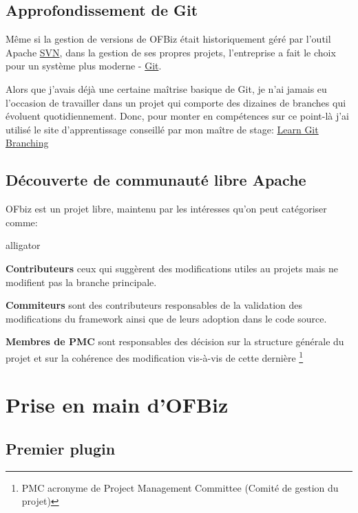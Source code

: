 \subsection{Approfondissement de Git }
Même si la gestion de versions de OFBiz était historiquement géré par l'outil Apache \href{https://subversion.apache.org/}{SVN}, dans la gestion de ses propres projets, l'entreprise a fait le choix pour un système plus moderne - \href{https://git-scm.com/}{Git}. 

Alors que j'avais déjà une certaine maîtrise basique de Git, je n'ai jamais eu l'occasion de travailler dans un projet qui comporte des dizaines de branches qui évoluent quotidiennement. Donc, pour monter en compétences sur ce point-là j'ai utilisé le site d'apprentissage conseillé par mon maître de stage: \href{https://learngitbranching.js.org/}{Learn Git Branching}

\subsection{Découverte de communauté libre Apache}
 OFbiz est un projet libre, maintenu par les intéresses qu'on peut catégoriser comme: 
 \begin{labeling}{alligator}
 	\item [\textbf{Contributeurs}] ceux qui suggèrent des modifications utiles au projets mais ne modifient pas la branche principale.
 	\item [\textbf{Commiteurs}] sont des contributeurs responsables de la validation des modifications du framework ainsi que de leurs adoption dans le code source. 
 	\item [\textbf{Membres de PMC}] sont responsables des décision  sur la structure  générale du projet et sur la cohérence des modification vis-à-vis de cette dernière  \footnote{PMC acronyme de Project Management Committee (Comité de gestion du projet)}
 \end{labeling}
 
 





\section{Prise en main d'OFBiz}

\subsection{Premier plugin}

